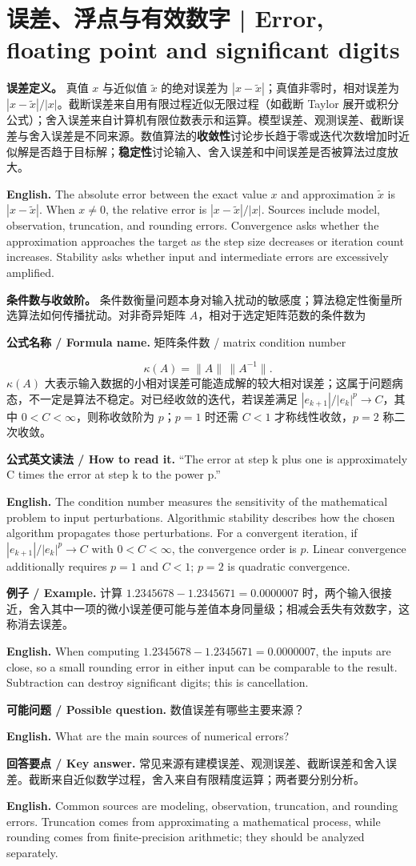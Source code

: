 \documentclass[UTF8,11pt,a4paper]{ctexart}
\newcommand{\EN}[1]{\par\noindent\textbf{English.} #1\par}
\newcommand{\READ}[1]{\par\noindent\textbf{公式英文读法 / How to read it.} #1\par}
\newcommand{\FORMULA}[2]{\par\noindent\textbf{公式名称 / Formula name.} #1 / #2\par}
\newcommand{\EX}[2]{\par\noindent\textbf{例子 / Example.} #1\par\EN{#2}}
\newcommand{\ASK}[4]{\par\noindent\textbf{可能问题 / Possible question.} #1\par\EN{#2}\noindent\textbf{回答要点 / Key answer.} #3\par\EN{#4}\medskip}
\begin{document}
\section{误差、浮点与有效数字 | Error, floating point and significant digits}
\noindent\textbf{误差定义。} 真值 $x$ 与近似值 $\tilde x$ 的绝对误差为 $|x-\tilde x|$；真值非零时，相对误差为 $|x-\tilde x|/|x|$。截断误差来自用有限过程近似无限过程（如截断 Taylor 展开或积分公式）；舍入误差来自计算机有限位数表示和运算。模型误差、观测误差、截断误差与舍入误差是不同来源。数值算法的\textbf{收敛性}讨论步长趋于零或迭代次数增加时近似解是否趋于目标解；\textbf{稳定性}讨论输入、舍入误差和中间误差是否被算法过度放大。

\EN{The absolute error between the exact value $x$ and approximation $\tilde x$ is $|x-\tilde x|$. When $x\ne0$, the relative error is $|x-\tilde x|/|x|$. Sources include model, observation, truncation, and rounding errors. Convergence asks whether the approximation approaches the target as the step size decreases or iteration count increases. Stability asks whether input and intermediate errors are excessively amplified.}

\noindent\textbf{条件数与收敛阶。} 条件数衡量问题本身对输入扰动的敏感度；算法稳定性衡量所选算法如何传播扰动。对非奇异矩阵 $A$，相对于选定矩阵范数的条件数为
\FORMULA{矩阵条件数}{matrix condition number}
\[
\kappa(A)=\|A\|\,\|A^{-1}\|.
\]
$\kappa(A)$ 大表示输入数据的小相对误差可能造成解的较大相对误差；这属于问题病态，不一定是算法不稳定。对已经收敛的迭代，若误差满足 $|e_{k+1}|/|e_k|^p\to C$，其中 $0<C<\infty$，则称收敛阶为 $p$；$p=1$ 时还需 $C<1$ 才称线性收敛，$p=2$ 称二次收敛。
\READ{“The error at step k plus one is approximately C times the error at step k to the power p.”}
\EN{The condition number measures the sensitivity of the mathematical problem to input perturbations. Algorithmic stability describes how the chosen algorithm propagates those perturbations. For a convergent iteration, if $|e_{k+1}|/|e_k|^p\to C$ with $0<C<\infty$, the convergence order is $p$. Linear convergence additionally requires $p=1$ and $C<1$; $p=2$ is quadratic convergence.}

\EX{计算 $1.2345678-1.2345671=0.0000007$ 时，两个输入很接近，舍入其中一项的微小误差便可能与差值本身同量级；相减会丢失有效数字，这称消去误差。}{When computing $1.2345678-1.2345671=0.0000007$, the inputs are close, so a small rounding error in either input can be comparable to the result. Subtraction can destroy significant digits; this is cancellation.}

\ASK{数值误差有哪些主要来源？}{What are the main sources of numerical errors?}{常见来源有建模误差、观测误差、截断误差和舍入误差。截断来自近似数学过程，舍入来自有限精度运算；两者要分别分析。}{Common sources are modeling, observation, truncation, and rounding errors. Truncation comes from approximating a mathematical process, while rounding comes from finite-precision arithmetic; they should be analyzed separately.}
\end{document}
